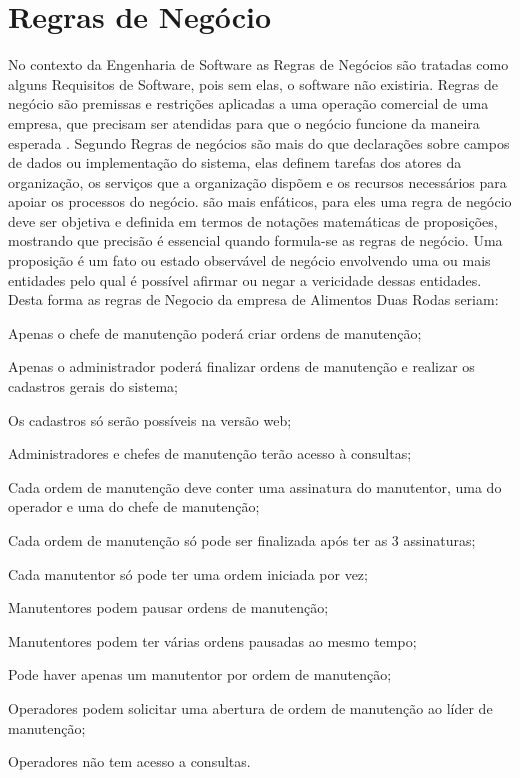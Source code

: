\section{Regras de Negócio}
No contexto da Engenharia de Software as Regras de Negócios são tratadas como alguns Requisitos de Software, pois sem elas, o software não existiria. Regras de negócio são premissas e restrições aplicadas a uma operação comercial de uma empresa, que precisam ser atendidas para que o negócio funcione da maneira esperada \cite{crerie2008identificacao}.
Segundo \cite{2001SilviaInes} Regras de negócios são mais do que declarações sobre campos de dados ou implementação do sistema, elas definem tarefas dos atores da organização, os serviços que a organização dispõem e os recursos necessários para apoiar os processos do negócio.
\cite{1997kilovSimmonds} são mais enfáticos, para eles uma regra de negócio deve ser objetiva e definida em termos de notações matemáticas de proposições, mostrando que precisão é essencial quando formula-se as regras de negócio. Uma proposição é um fato ou estado observável de negócio envolvendo uma ou mais entidades pelo qual é possível afirmar ou negar a vericidade dessas entidades.
Desta forma as regras de Negocio da empresa de Alimentos Duas Rodas seriam:

\begin{subalineas}
	\item {Apenas o chefe de manutenção poderá criar ordens de manutenção};
	\item {Apenas o administrador poderá finalizar ordens de manutenção e realizar os cadastros gerais do sistema};
	\item {Os cadastros só serão possíveis na versão web};
	\item {Administradores e chefes de manutenção terão acesso à consultas};
	\item {Cada ordem de manutenção deve conter uma assinatura do manutentor, uma do operador e uma do chefe de manutenção};
	\item {Cada ordem de manutenção só pode ser finalizada após ter as 3 assinaturas};
	\item {Cada manutentor só pode ter uma ordem iniciada por vez};
	\item {Manutentores podem pausar ordens de manutenção};
	\item {Manutentores podem ter várias ordens pausadas ao mesmo tempo};
	\item {Pode haver apenas um manutentor por ordem de manutenção};
	\item {Operadores podem solicitar uma abertura de ordem de manutenção ao líder de manutenção};
	\item {Operadores não  tem acesso a consultas}.
\end{subalineas}
